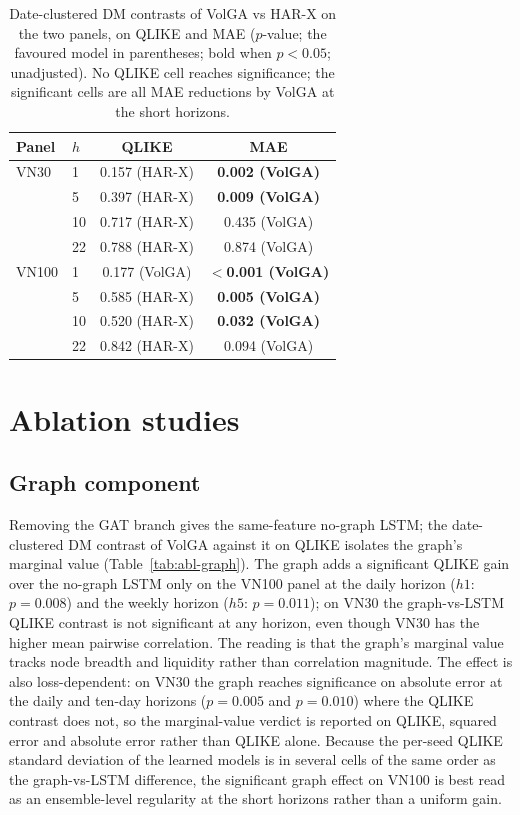 \documentclass[runningheads]{llncs}
\begin{document}
\begin{table}[t]
\centering
\caption{Date-clustered DM contrasts of VolGA vs HAR-X on the two panels, on QLIKE and MAE ($p$-value;
the favoured model in parentheses; bold when $p<0.05$; unadjusted). No QLIKE cell reaches
significance; the significant cells are all MAE reductions by VolGA at the short horizons.}
\label{tab:dm}
\footnotesize
\setlength{\tabcolsep}{5pt}
\begin{tabular}{llcc}
\toprule
Panel & $h$ & QLIKE & MAE \\
\midrule
VN30 & 1 & 0.157 (HAR-X) & \textbf{0.002 (VolGA)} \\
     & 5 & 0.397 (HAR-X) & \textbf{0.009 (VolGA)} \\
     & 10 & 0.717 (HAR-X) & 0.435 (VolGA) \\
     & 22 & 0.788 (HAR-X) & 0.874 (VolGA) \\
\midrule
VN100 & 1 & 0.177 (VolGA) & \textbf{$<$0.001 (VolGA)} \\
      & 5 & 0.585 (HAR-X) & \textbf{0.005 (VolGA)} \\
      & 10 & 0.520 (HAR-X) & \textbf{0.032 (VolGA)} \\
      & 22 & 0.842 (HAR-X) & 0.094 (VolGA) \\
\bottomrule
\end{tabular}
\end{table}

\FloatBarrier
\section{Ablation studies}\label{sec:abl}
\subsection{Graph component}
Removing the GAT branch gives the same-feature no-graph LSTM; the date-clustered DM contrast of VolGA
against it on QLIKE isolates the graph's marginal value (Table~\ref{tab:abl-graph}). The graph adds a
significant QLIKE gain over the no-graph LSTM only on the VN100 panel at the daily horizon
($h1$: $p=0.008$) and the weekly horizon ($h5$: $p=0.011$); on VN30 the graph-vs-LSTM QLIKE contrast
is not significant at any horizon, even though VN30 has the higher mean pairwise correlation. The
reading is that the graph's marginal value tracks node breadth and liquidity rather than
correlation magnitude. The effect is also loss-dependent: on VN30 the graph reaches significance on
absolute error at the daily and ten-day horizons ($p=0.005$ and $p=0.010$) where the QLIKE contrast
does not, so the marginal-value verdict is reported on QLIKE, squared error and absolute error rather
than QLIKE alone. Because the per-seed QLIKE standard deviation of the learned models is in several
cells of the same order as the graph-vs-LSTM difference, the significant graph effect on VN100 is
best read as an ensemble-level regularity at the short horizons rather than a uniform gain.
\end{document}
